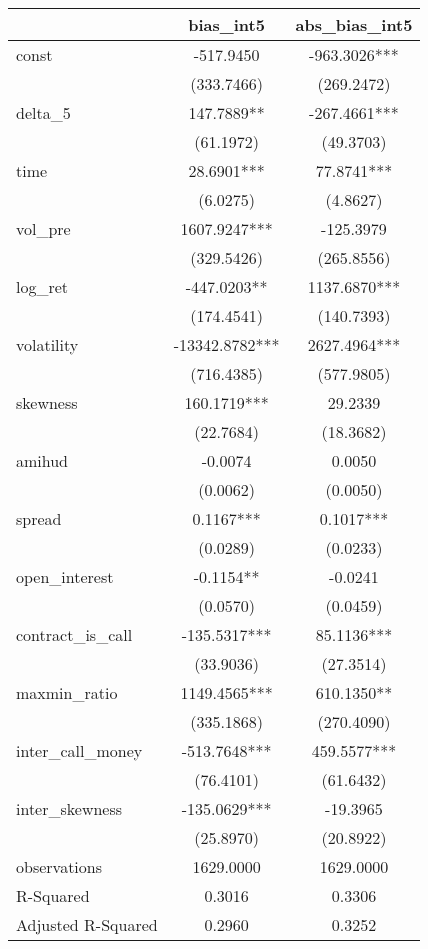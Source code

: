 \begin{tabular}{lcc}
\hline
                   &   bias\_int5   & abs\_bias\_int5  \\
\midrule
\midrule
const              & -517.9450      & -963.3026***     \\
                   & (333.7466)     & (269.2472)       \\
delta\_5           & 147.7889**     & -267.4661***     \\
                   & (61.1972)      & (49.3703)        \\
time               & 28.6901***     & 77.8741***       \\
                   & (6.0275)       & (4.8627)         \\
vol\_pre           & 1607.9247***   & -125.3979        \\
                   & (329.5426)     & (265.8556)       \\
log\_ret           & -447.0203**    & 1137.6870***     \\
                   & (174.4541)     & (140.7393)       \\
volatility         & -13342.8782*** & 2627.4964***     \\
                   & (716.4385)     & (577.9805)       \\
skewness           & 160.1719***    & 29.2339          \\
                   & (22.7684)      & (18.3682)        \\
amihud             & -0.0074        & 0.0050           \\
                   & (0.0062)       & (0.0050)         \\
spread             & 0.1167***      & 0.1017***        \\
                   & (0.0289)       & (0.0233)         \\
open\_interest     & -0.1154**      & -0.0241          \\
                   & (0.0570)       & (0.0459)         \\
contract\_is\_call & -135.5317***   & 85.1136***       \\
                   & (33.9036)      & (27.3514)        \\
maxmin\_ratio      & 1149.4565***   & 610.1350**       \\
                   & (335.1868)     & (270.4090)       \\
inter\_call\_money & -513.7648***   & 459.5577***      \\
                   & (76.4101)      & (61.6432)        \\
inter\_skewness    & -135.0629***   & -19.3965         \\
                   & (25.8970)      & (20.8922)        \\
observations       & 1629.0000      & 1629.0000        \\
R-Squared          & 0.3016         & 0.3306           \\
Adjusted R-Squared & 0.2960         & 0.3252           \\
\hline
\end{tabular}